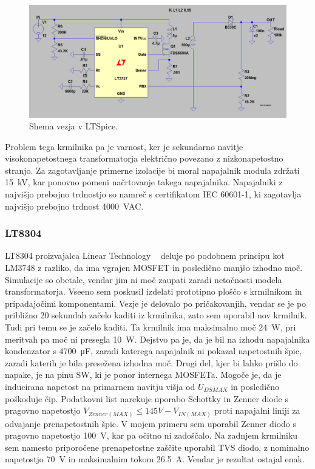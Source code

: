 \documentclass[a4paper,twoside,openright,12pt,Slovene]{book}
\begin{document}
    \begin{figure}[H]
        \centering
        \includegraphics[width=1\columnwidth]{Slike/Simulacije/LM3757spice.png}
        \caption{\label{LM3757spice} Shema vezja v LTSpice.}
    \end{figure}
    
Problem tega krmilnika pa je varnost, ker je sekundarno navitje visokonapetostnega transformatorja električno povezano z nizkonapetostno stranjo. Za zagotavljanje primerne izolacije bi moral napajalnik modula zdržati \SI{15}{\kilo\volt}, kar ponovno pomeni načrtovanje takega napajalnika. Napajalniki z najvišjo prebojno trdnostjo so namreč s certifikatom IEC 60601-1, ki zagotavlja najvišjo prebojno trdnost \SI{4000}{\volt}AC.

	\subsubsection{LT8304} \label{LT8304}
LT8304 proizvajalca Linear Technology ~\cite{analog:LT8304} deluje po podobnem principu kot LM3748 z razliko, da ima vgrajen MOSFET in posledično manjšo izhodno moč. Simulacije so obetale, vendar jim ni moč zaupati zaradi netočnosti modela transformatorja. Vseeno sem poskusil izdelati prototipno ploščo s krmilnikom in pripadajočimi komponentami. Vezje je delovalo po pričakovanjih, vendar se je po približno 20 sekundah začelo kaditi iz krmilnika, zato sem uporabil nov krmilnik.
Tudi pri temu se je začelo kaditi. Ta krmilnik ima maksimalno moč \SI{24}{\watt}, pri meritvah pa moč ni presegla \SI{10}{\watt}. Dejstvo pa je, da je bil na izhodu napajalnika kondenzator s \SI{4700}{\micro\farad}, zaradi katerega napajalnik ni pokazal napetostnih špic, zaradi katerih je bila presežena izhodna moč. Drugi del, kjer bi lahko prišlo do napake, je na pinu SW, ki je ponor internega MOSFETa. Mogoče je, da je inducirana napetost na primarnem navitju višja od \(U_{DS MAX}\) in posledično poškoduje čip. Podatkovni list narekuje uporabo Schottky in Zenner diode s pragovno napetostjo \(V_{Zenner(MAX)} \leq 145 V - V_{IN(MAX)}\) proti napajalni liniji za odvajanje prenapetostnih špic. V mojem primeru sem uporabil Zenner diodo s pragovno napetostjo \SI{100}{\volt}, kar pa očitno ni zadoščalo. Na zadnjem krmilniku sem namesto priporočene prenapetostne zaščite uporabil TVS diodo, z nominalno napetostjo \SI{70}{\volt} in maksimalnim tokom \SI{26,5}{\ampere}. Vendar je rezultat ostajal enak.
\end{document}
